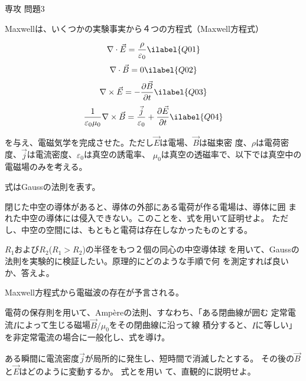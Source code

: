 \documentclass[fleqn]{jbook}
\begin{document}
\begin{question}{専攻 問題3}{}

Maxwellは、いくつかの実験事実から４つの方程式（Maxwell方程式）

\begin{eqnarray}
  \nabla \cdot \vec{E} = \frac {\rho}{\varepsilon_{0}} 
  \ilabel{Q01}
\end{eqnarray} 
\begin{eqnarray}
  \nabla \cdot \vec{B} = 0
  \ilabel{Q02}
\end{eqnarray} 
\begin{eqnarray}
  \nabla \times \vec{E} = - \frac{\partial \vec{B}}{\partial t}
  \ilabel{Q03}
\end{eqnarray} 
\begin{eqnarray}
  \frac{1}{\varepsilon_{0} \mu_{0}}\nabla \times \vec{B} = %
  \frac{\vec{j}}{\varepsilon_{0}} + \frac{\partial \vec{E}}{\partial t}      
  \ilabel{Q04}
\end{eqnarray} 

を与え、電磁気学を完成させた。ただし$\vec{E}$は電場、$\vec{B}$は磁束密
度、$\rho$は電荷密度、$\vec{j}$は電流密度、$\varepsilon_{0}$は真空の誘電率、
$\mu_{0}$は真空の透磁率で、以下では真空中の電磁場のみを考える。

\begin{subquestions}
\SubQuestion
  式はGaussの法則を表す。
  \begin{subsubquestions}
  \SubSubQuestion
  閉じた中空の導体があると、導体の外部にある電荷が作る電場は、導体に囲
  まれた中空の導体には侵入できない。このことを、式を用いて証明せよ。
  ただし、中空の空間には、もともと電荷は存在しなかったものとする。

  \SubSubQuestion
  $R_{1}$および$R_{2}$($R_{1}>R_{2}$)の半径をもつ２個の同心の中空導体球
  を用いて、Gaussの法則を実験的に検証したい。原理的にどのような手順で何
  を測定すれば良いか、答えよ。
  \end{subsubquestions}

\SubQuestion
  Maxwell方程式から電磁波の存在が予言される。
  \begin{subsubquestions}
  \SubSubQuestion
  電荷の保存則を用いて、Amp\`{e}reの法則、すなわち、「ある閉曲線が囲む
  定常電流$I$によって生じる磁場$\vec{B}/\mu_{0}$をその閉曲線に沿って線
  積分すると、$I$に等しい」を非定常電流の場合に一般化し、式を導け。

  \SubSubQuestion
  ある瞬間に電流密度$\vec{j}$が局所的に発生し、短時間で消滅したとする。
  その後の$\vec{B}$と$\vec{E}$はどのように変動するか。
  式とを用い
  て、直観的に説明せよ。


\end{subsubquestions}
\end{subquestions}
\end{question}
\end{document}
